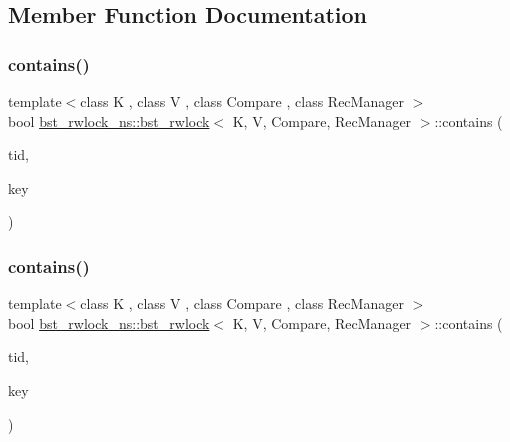 \subsection{Member Function Documentation}
\mbox{\label{classbst__rwlock__ns_1_1bst__rwlock_ade66bdd27e466ccfcda067ebc139f2e8}} 
\subsubsection{\texorpdfstring{contains()}{contains()}\hspace{0.1cm}{\footnotesize\ttfamily [1/2]}}
{\footnotesize\ttfamily template$<$class K , class V , class Compare , class Rec\+Manager $>$ \\
bool \hyperlink{classbst__rwlock__ns_1_1bst__rwlock}{bst\+\_\+rwlock\+\_\+ns\+::bst\+\_\+rwlock}$<$ K, V, Compare, Rec\+Manager $>$\+::contains (\begin{DoxyParamCaption}\item[{const int}]{tid,  }\item[{const K \&}]{key }\end{DoxyParamCaption})\hspace{0.3cm}{\ttfamily [inline]}}

\mbox{\label{classbst__rwlock__ns_1_1bst__rwlock_ade66bdd27e466ccfcda067ebc139f2e8}} 
\subsubsection{\texorpdfstring{contains()}{contains()}\hspace{0.1cm}{\footnotesize\ttfamily [2/2]}}
{\footnotesize\ttfamily template$<$class K , class V , class Compare , class Rec\+Manager $>$ \\
bool \hyperlink{classbst__rwlock__ns_1_1bst__rwlock}{bst\+\_\+rwlock\+\_\+ns\+::bst\+\_\+rwlock}$<$ K, V, Compare, Rec\+Manager $>$\+::contains (\begin{DoxyParamCaption}\item[{const int}]{tid,  }\item[{const K \&}]{key }\end{DoxyParamCaption})\hspace{0.3cm}{\ttfamily [inline]}}

